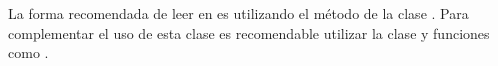   La forma recomendada de leer en \java es utilizando el método 
  de la clase .
  Para complementar el uso de esta clase es recomendable utilizar la clase
   y funciones como .

